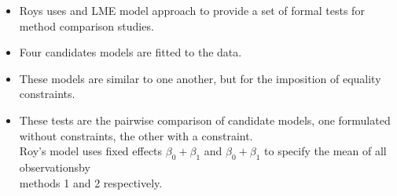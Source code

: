 \documentclass[compress]{beamer}        %
\begin{document}



\begin{frame}
\begin{itemize}

\item Roys uses and LME model approach to provide a set of formal tests for method comparison studies.\\

\item Four candidates models are fitted to the data.

\item 
These models are similar to one another, but for the imposition of equality constraints.

\item 
These tests are the pairwise comparison of candidate models, one formulated without constraints, the other with a constraint.\\


Roy's model uses fixed effects $\beta_0 + \beta_1$ and $\beta_0 + \beta_1$ to specify the mean of all observationsby \\ methods 1 and 2 respectively.
\end{itemize}
\end{frame}
\end{document}
